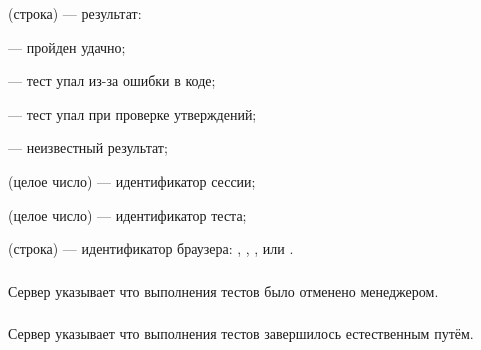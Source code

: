 \begin{icItems}
	\item {} (строка) — результат:
	\begin{icItems}
		\item {} — пройден удачно;
		\item {} — тест упал из-за ошибки в коде;
		\item {} — тест упал при проверке утверждений;
		\item {} — неизвестный результат;
	\end{icItems}
	\item {} (целое число) — идентификатор сессии;
	\item {} (целое число) — идентификатор теста;
	\item {} (строка) — идентификатор браузера: , , ,  или .
\end{icItems}

\subsubsection{}

Сервер указывает что выполнения тестов было отменено менеджером.

\subsubsection{}

Сервер указывает что выполнения тестов завершилось естественным путём.